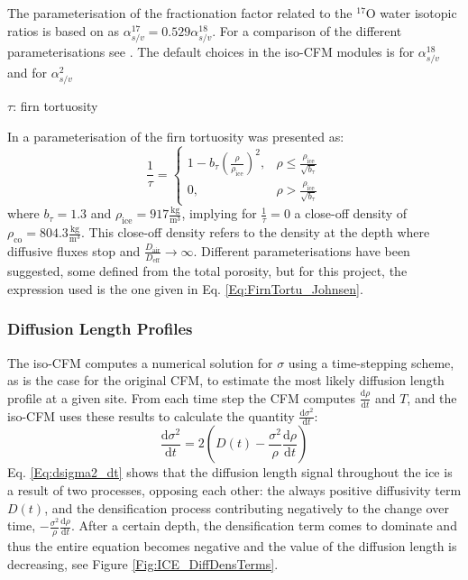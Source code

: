 \documentclass[../../CompleteThesis2/Complete_2ndDraft.tex]{subfiles}
\begin{document}
	The parameterisation of the fractionation factor related to the $^{17}$O water isotopic ratios is based on \cite[Barkan and Luz, 2005]{BarkanLuz2005} as $\alpha_{s/v}^{17} = 0.529 \alpha_{s/v}^{18}$. For a comparison of the different parameterisations see \cite[Gkinis et al., 2021]{Gkinis2021}. The default choices in the iso-CFM modules is \cite[Majoube 1971]{Majoube1970} for $\alpha_{s/v}^{18}$ and \cite[Merlivat and Nief, 1967]{MerlivatNief1967} for $\alpha_{s/v}^{2}$
	
	$\tau$: firn tortuosity
	
	In \cite[Johnsen et al., 2000]{Johnsen2000} a parameterisation of the firn tortuosity was presented as:
	\begin{equation}
		\frac{1}{\tau} = \begin{cases}
			1 - b_{\tau}\left(\frac{\rho}{\rho_{\text{ice}}}\right)^2,  & \rho \leq \frac{\rho_{\text{ice}}}{\sqrt{b_{\tau}}} \\
			0, & \rho > \frac{\rho_{\text{ice}}}{\sqrt{b_{\tau}}}
		\end{cases}
		\label{Eq:FirnTortu_Johnsen}
	\end{equation}
	where $b_{\tau} = 1.3$ and $\rho_{\text{ice}} = 917 \frac{\text{kg}}{\text{m}^3}$, implying for $\frac{1}{\tau}=0$ a close-off density of $\rho_{\text{co}} = 804.3 \frac{\text{kg}}{\text{m}^3}$. This close-off density refers to the density at the depth where diffusive fluxes stop and $\frac{D_{\text{air}}}{D_{\text{eff}}}\rightarrow \infty$. Different parameterisations have been suggested, some defined from the total porosity, but for this project, the expression used is the one given in Eq. \ref{Eq:FirnTortu_Johnsen}.
	
	\subsubsection[Diffusion Length Profiles]{Diffusion Length Profiles}
	\label{Subsubsec:Ice_DiffusionAndDensification_IsoCFM_DiffLenProfile}
	
	The iso-CFM computes a numerical solution for $\sigma$ using a time-stepping scheme, as is the case for the original CFM, to estimate the most likely diffusion length profile at a given site. From each time step the CFM computes $\frac{\text{d}\rho}{\text{d}t}$ and $T$, and the iso-CFM uses these results to calculate the quantity $\frac{\text{d}\sigma^2}{\text{d}t}$:
	\begin{equation}
		\frac{\text{d}\sigma^2}{\text{d}t} = 2\left(D(t) - \frac{\sigma^2}{\rho}\frac{\text{d}\rho}{\text{d}t}\right)
		\label{Eq:dsigma2_dt}
	\end{equation}
	Eq. \ref{Eq:dsigma2_dt} shows that the diffusion length signal throughout the ice is a result of two processes, opposing each other: the always positive diffusivity term $D(t)$, and the densification process contributing negatively to the change over time, $-\frac{\sigma^2}{\rho}\frac{\text{d}\rho}{\text{d}t}$. After a certain depth, the densification term comes to dominate and thus the entire equation becomes negative and the value of the diffusion length is decreasing, see Figure \ref{Fig:ICE_DiffDensTerms}.
	
\end{document}
